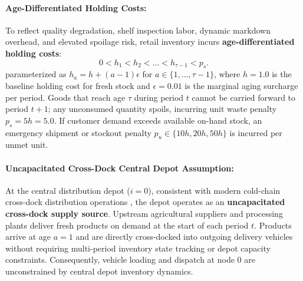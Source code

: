 \documentclass[11pt,a4paper]{article}
\theoremstyle{definition}
\theoremstyle{remark}
\begin{document}
\paragraph{Age-Differentiated Holding Costs:}
To reflect quality degradation, shelf inspection labor, dynamic markdown overhead, and elevated spoilage risk, retail inventory incurs \textbf{age-differentiated holding costs}:
\begin{equation*}
    0 < h_1 < h_2 < \dots < h_{\tau-1} < p_s.
\end{equation*}
parameterized as $h_a = h + (a - 1)\epsilon$ for $a \in \{1, \dots, \tau-1\}$, where $h = 1.0$ is the baseline holding cost for fresh stock and $\epsilon = 0.01$ is the marginal aging surcharge per period. Goods that reach age $\tau$ during period $t$ cannot be carried forward to period $t+1$; any unconsumed quantity spoils, incurring unit waste penalty $p_s = 5h = 5.0$. If customer demand exceeds available on-hand stock, an emergency shipment or stockout penalty $p_u \in \{10h, 20h, 50h\}$ is incurred per unmet unit.

\paragraph{Uncapacitated Cross-Dock Central Depot Assumption:}
At the central distribution depot ($i = 0$), consistent with modern cold-chain cross-dock distribution operations \citep{nahmias1982perishable,coelho2014optimal}, the depot operates as an \textbf{uncapacitated cross-dock supply source}. Upstream agricultural suppliers and processing plants deliver fresh products on demand at the start of each period $t$. Products arrive at age $a = 1$ and are directly cross-docked into outgoing delivery vehicles without requiring multi-period inventory state tracking or depot capacity constraints. Consequently, vehicle loading and dispatch at node $0$ are unconstrained by central depot inventory dynamics.
\end{document}
